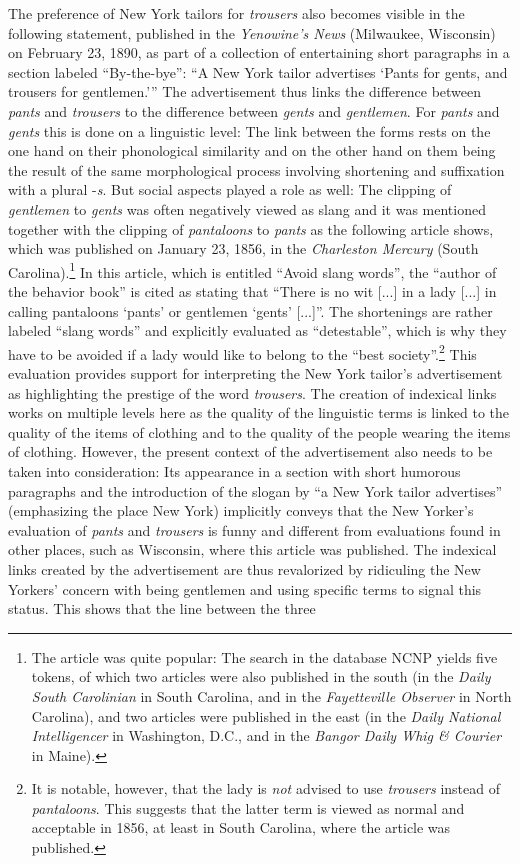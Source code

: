 The preference of New York tailors for \emph{trousers} also becomes visible in the following statement, published in the \emph{Yenowine’s News} (Milwaukee, Wisconsin) on February 23, 1890, as part of a collection of entertaining short paragraphs in a section labeled “By-the-bye”: “A New York tailor advertises ‘Pants for gents, and trousers for gentlemen.’” The advertisement thus links the difference between \emph{pants} and \emph{trousers} to the difference between \emph{gents} and \emph{gentlemen}. For \emph{pants} and \emph{gents} this is done on a linguistic level: The link between the forms rests on the one hand on their phonological similarity and on the other hand on them being the result of the same morphological process involving shortening and suffixation with a plural -\emph{s}. But social aspects played a role as well: The clipping of \emph{gentlemen} to \emph{gents} was often negatively viewed as slang and it was mentioned together with the clipping of \emph{pantaloons} to \emph{pants} as the following article shows, which was published on January 23, 1856, in the \textit{Charleston Mercury} (South Carolina).\footnote{The article was quite popular: The search in the database NCNP yields five tokens, of which two articles were also published in the south (in the \textit{Daily South Carolinian} in South Carolina, and in the \textit{Fayetteville Observer} in North Carolina), and two articles were published in the east (in the \textit{Daily National Intelligencer} in Washington, D.C., and in the \textit{Bangor Daily Whig \& Courier} in Maine).} In this article, which is entitled “Avoid slang words”, the “author of the behavior book” is cited as stating that “There is no wit [...] in a lady [...] in calling pantaloons ‘pants’ or gentlemen ‘gents’ [...]”. The shortenings are rather labeled “slang words” and explicitly evaluated as “detestable”, which is why they have to be avoided if a lady would like to belong to the “best society”.\footnote{It is notable, however, that the lady is \emph{not} advised to use \emph{trousers} instead of \emph{pantaloons}. This suggests that the latter term is viewed as normal and acceptable in 1856, at least in South Carolina, where the article was published.} This evaluation provides support for interpreting the New York tailor’s advertisement as highlighting the prestige of the word \emph{trousers}. The creation of indexical links works on multiple levels here as the quality of the linguistic terms is linked to the quality of the items of clothing and to the quality of the people wearing the items of clothing. However, the present context of the advertisement also needs to be taken into consideration: Its appearance in a section with short humorous paragraphs and the introduction of the slogan by “a New York tailor advertises” (emphasizing the place New York) implicitly conveys that the New Yorker’s evaluation of \emph{pants} and \emph{trousers} is funny and different from evaluations found in other places, such as Wisconsin, where this article was published. The indexical links created by the advertisement are thus revalorized by ridiculing the New Yorkers’ concern with being gentlemen and using specific terms to signal this status. This shows that the line between the three 